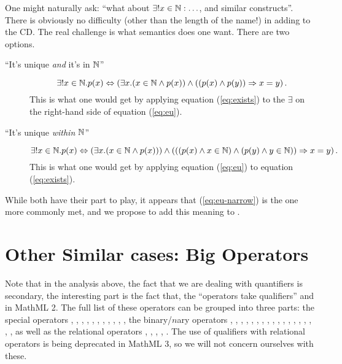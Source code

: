 \documentclass{llncs}
\begin{document}
One might naturally ask: ``what about $\exists!x\in \mathbb{N}:\ldots$, and similar
constructs''. There is obviously no difficulty (other than the length of the
name!) in adding {} to the {}
CD. The real challenge is what semantics does one want. There are two options.
\begin{description}
\item[``It's unique {\it and\/} it's in $\mathbb{N}$'']
\begin{equation}\label{eq:eu-broad}
\exists! x\in\mathbb{N}.p(x) \Leftrightarrow (\exists x.(x\in\mathbb{N}\land p(x))\land 
\left((p(x)\land p(y))\Rightarrow x=y\right).
\end{equation}
This is what one would get by applying equation (\ref{eq:exists}) to the
$\exists$ on the right-hand side of equation (\ref{eq:eu}).
\item[``It's unique {\it within\/} $\mathbb{N}$'']
\begin{equation}\label{eq:eu-narrow}
\exists! x\in\mathbb{N}.p(x)\Leftrightarrow (\exists x.(x\in\mathbb{N}\land p(x)))\land
\left(((p(x)\land x\in\mathbb{N})\land (p(y)\land y\in\mathbb{N}))\Rightarrow x=y\right).
\end{equation}
This is what one would get by applying equation (\ref{eq:eu}) to equation
(\ref{eq:exists}).
\end{description}
While both have their part to play, it appears that (\ref{eq:eu-narrow}) is
the one more commonly met, and we propose to add this meaning to
{}.

\section{Other Similar cases: Big Operators}

Note that in the analysis above, the fact that we are dealing with quantifiers is
secondary, the interesting part is the fact that, the ``operators take qualifiers''
{} and {} in MathML 2. The full list of
these operators can be grouped into three parts: the special operators {},
{}, {}, {}, {},
{}, {}, {}, {},
{}, {}, the binary/$n$ary operators {},
{}, {}, {}, {}, {},
{}, {}, {}, {},
{}, {}, {}, {}, {},
{}, {}, {}, as well as the
relational operators {}, {}, {}, {},
{}. The use of qualifiers with relational operators is being deprecated in
MathML 3, so we will not concern ourselves with these.
\end{document}
